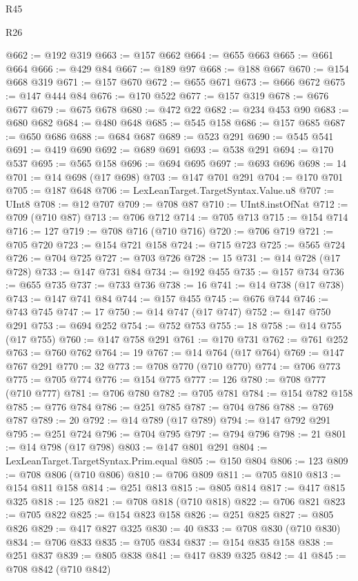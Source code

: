\begin{lexlean}{R45}
\begin{lexlean}{R26}
\begin{coremodule}
{{{{{{{{{{{{{{{{{{{{{{{{{{{{{{{{{{{{{{{{{{{{{{{{{{{{{{{{{{{{{{{{{{{{{{{{@662 := @192 @319
@663 := @157 @662
@664 := @655 @663
@665 := @661 @664
@666 := @429 @84
@667 := @189 @97
@668 := @188 @667
@670 := @154 @668 @319
@671 := @157 @670
@672 := @655 @671
@673 := @666 @672
@675 := @147 @444 @84
@676 := @170 @522
@677 := @157 @319
@678 := @676 @677
@679 := @675 @678
@680 := @472 @22
@682 := @234 @453 @90
@683 := @680 @682
@684 := @480 @648
@685 := @545 @158
@686 := @157 @685
@687 := @650 @686
@688 := @684 @687
@689 := @523 @291
@690 := @545 @541
@691 := @419 @690
@692 := @689 @691
@693 := @538 @291
@694 := @170 @537
@695 := @565 @158
@696 := @694 @695
@697 := @693 @696
@698 := 14
@701 := @14 @698 (@17 @698)
@703 := @147 @701 @291
@704 := @170 @701
@705 := @187 @648
@706 := LexLeanTarget.TargetSyntax.Value.u8
@707 := UInt8
@708 := @12 @707
@709 := @708 @87
@710 := UInt8.instOfNat
@712 := @709 (@710 @87)
@713 := @706 @712
@714 := @705 @713
@715 := @154 @714
@716 := 127
@719 := @708 @716 (@710 @716)
@720 := @706 @719
@721 := @705 @720
@723 := @154 @721 @158
@724 := @715 @723
@725 := @565 @724
@726 := @704 @725
@727 := @703 @726
@728 := 15
@731 := @14 @728 (@17 @728)
@733 := @147 @731 @84
@734 := @192 @455
@735 := @157 @734
@736 := @655 @735
@737 := @733 @736
@738 := 16
@741 := @14 @738 (@17 @738)
@743 := @147 @741 @84
@744 := @157 @455
@745 := @676 @744
@746 := @743 @745
@747 := 17
@750 := @14 @747 (@17 @747)
@752 := @147 @750 @291
@753 := @694 @252
@754 := @752 @753
@755 := 18
@758 := @14 @755 (@17 @755)
@760 := @147 @758 @291
@761 := @170 @731
@762 := @761 @252
@763 := @760 @762
@764 := 19
@767 := @14 @764 (@17 @764)
@769 := @147 @767 @291
@770 := 32
@773 := @708 @770 (@710 @770)
@774 := @706 @773
@775 := @705 @774
@776 := @154 @775
@777 := 126
@780 := @708 @777 (@710 @777)
@781 := @706 @780
@782 := @705 @781
@784 := @154 @782 @158
@785 := @776 @784
@786 := @251 @785
@787 := @704 @786
@788 := @769 @787
@789 := 20
@792 := @14 @789 (@17 @789)
@794 := @147 @792 @291
@795 := @251 @724
@796 := @704 @795
@797 := @794 @796
@798 := 21
@801 := @14 @798 (@17 @798)
@803 := @147 @801 @291
@804 := LexLeanTarget.TargetSyntax.Prim.equal
@805 := @150 @804
@806 := 123
@809 := @708 @806 (@710 @806)
@810 := @706 @809
@811 := @705 @810
@813 := @154 @811 @158
@814 := @251 @813
@815 := @805 @814
@817 := @417 @815 @325
@818 := 125
@821 := @708 @818 (@710 @818)
@822 := @706 @821
@823 := @705 @822
@825 := @154 @823 @158
@826 := @251 @825
@827 := @805 @826
@829 := @417 @827 @325
@830 := 40
@833 := @708 @830 (@710 @830)
@834 := @706 @833
@835 := @705 @834
@837 := @154 @835 @158
@838 := @251 @837
@839 := @805 @838
@841 := @417 @839 @325
@842 := 41
@845 := @708 @842 (@710 @842)
}}}}}}}}}}}}}}}}}}}}}}}}}}}}}}}}}}}}}}}}}}}}}}}}}}}}}}}}}}}}}}}}}}}}}}}}
\end{coremodule}
\end{lexlean}
\end{lexlean}
